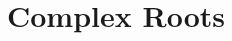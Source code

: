\documentclass{ximera}
\title[Dig-In:]{Complex Roots}
\begin{document}
\begin{abstract}
  
\end{abstract}
\maketitle
\end{document}
